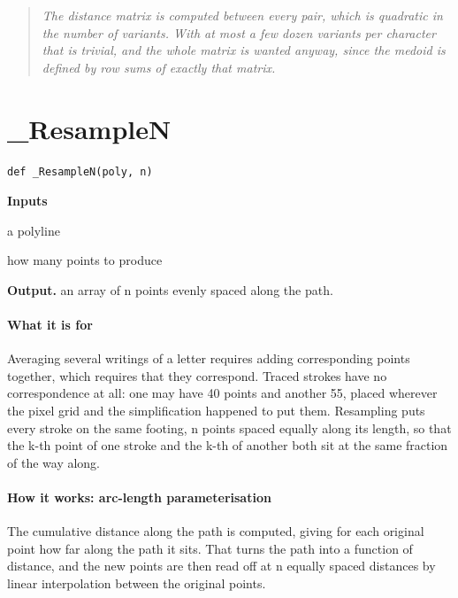\begin{quote}\small\itshape The distance matrix is computed between every pair, which is quadratic in the number of variants. With at most a few dozen variants per character that is trivial, and the whole matrix is wanted anyway, since the medoid is defined by row sums of exactly that matrix.\end{quote}

\section{\_ResampleN}
\begin{lstlisting}[style=sig]
def _ResampleN(poly, n)
\end{lstlisting}

\noindent\textbf{Inputs}
\begin{description}[leftmargin=2.2em,style=nextline,font=\normalfont\ttfamily]\setlength\itemsep{1pt}
  \item[{poly}] \normalfont a polyline
  \item[{n}] \normalfont how many points to produce
\end{description}

\noindent\textbf{Output.} an array of n points evenly spaced along the path.


\paragraph{What it is for}
Averaging several writings of a letter requires adding corresponding points together, which requires that they correspond. Traced strokes have no correspondence at all: one may have 40 points and another 55, placed wherever the pixel grid and the simplification happened to put them. Resampling puts every stroke on the same footing, n points spaced equally along its length, so that the k-th point of one stroke and the k-th of another both sit at the same fraction of the way along.


\paragraph{How it works: arc-length parameterisation}
The cumulative distance along the path is computed, giving for each original point how far along the path it sits. That turns the path into a function of distance, and the new points are then read off at n equally spaced distances by linear interpolation between the original points.


